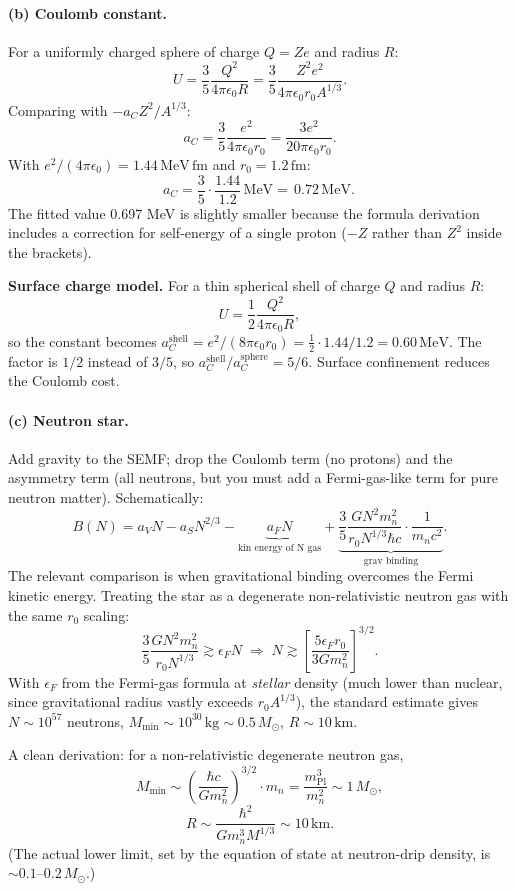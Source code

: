 \documentclass[11pt]{article}
\newcommand{\fm}{\,\mathrm{fm}}
\newcommand{\MeV}{\,\mathrm{MeV}}
\begin{document}
\paragraph{(b) Coulomb constant.} For a uniformly charged sphere of charge $Q=Ze$ and radius $R$:
\[
U=\frac{3}{5}\frac{Q^{2}}{4\pi\epsilon_{0}R}=\frac{3}{5}\frac{Z^{2}e^{2}}{4\pi\epsilon_{0}r_0 A^{1/3}}.
\]
Comparing with $-a_C Z^{2}/A^{1/3}$:
\[
a_C=\frac{3}{5}\frac{e^{2}}{4\pi\epsilon_{0}r_0}=\frac{3 e^{2}}{20\pi\epsilon_{0}r_0}.
\]
With $e^{2}/(4\pi\epsilon_{0})=1.44\MeV\fm$ and $r_0=1.2\fm$:
\[
a_C=\frac{3}{5}\cdot\frac{1.44}{1.2}\MeV=\boxed{\,0.72\MeV.\,}
\]
The fitted value 0.697 MeV is slightly smaller because the formula derivation includes a correction for self-energy of a single proton ($-Z$ rather than $Z^{2}$ inside the brackets).

\textbf{Surface charge model.} For a thin spherical shell of charge $Q$ and radius $R$:
\[
U=\frac{1}{2}\frac{Q^{2}}{4\pi\epsilon_{0}R},
\]
so the constant becomes $a_C^\mathrm{shell}=e^{2}/(8\pi\epsilon_{0}r_0)=\tfrac{1}{2}\cdot 1.44/1.2=0.60\MeV$. The factor is $1/2$ instead of $3/5$, so $a_C^\mathrm{shell}/a_C^\mathrm{sphere}=5/6$. Surface confinement reduces the Coulomb cost.

\paragraph{(c) Neutron star.} Add gravity to the SEMF; drop the Coulomb term (no protons) and the asymmetry term (all neutrons, but you must add a Fermi-gas-like term for pure neutron matter). Schematically:
\[
B(N)=a_V N-a_S N^{2/3}-\underbrace{a_F N}_{\text{kin energy of N gas}}+\underbrace{\frac{3}{5}\frac{G N^{2}m_n^{2}}{r_0 N^{1/3}\hbar c}\cdot\frac{1}{m_n c^{2}}}_{\text{grav binding}}.
\]
The relevant comparison is when gravitational binding overcomes the Fermi kinetic energy. Treating the star as a degenerate non-relativistic neutron gas with the same $r_0$ scaling:
\[
\frac{3}{5}\frac{G N^{2}m_n^{2}}{r_0 N^{1/3}}\gtrsim \epsilon_F N\;\Rightarrow\; N\gtrsim\!\left[\frac{5\epsilon_F r_0}{3 G m_n^{2}}\right]^{3/2}\!.
\]
With $\epsilon_F$ from the Fermi-gas formula at \emph{stellar} density (much lower than nuclear, since gravitational radius vastly exceeds $r_0 A^{1/3}$), the standard estimate gives $N\sim 10^{57}$ neutrons, $M_\mathrm{min}\sim 10^{30}\,\mathrm{kg}\sim 0.5\,M_\odot$, $R\sim 10\,\mathrm{km}$.

A clean derivation: for a non-relativistic degenerate neutron gas,
\[
M_\mathrm{min}\sim\!\left(\frac{\hbar c}{G m_n^{2}}\right)^{3/2}\cdot m_n=\frac{m_\mathrm{Pl}^{3}}{m_n^{2}}\sim 1\,M_\odot,
\]
\[
R\sim\frac{\hbar^{2}}{G m_n^{3}M^{1/3}}\sim 10\,\mathrm{km}.
\]
(The actual lower limit, set by the equation of state at neutron-drip density, is $\sim 0.1$--$0.2\,M_\odot$.)
\end{document}
